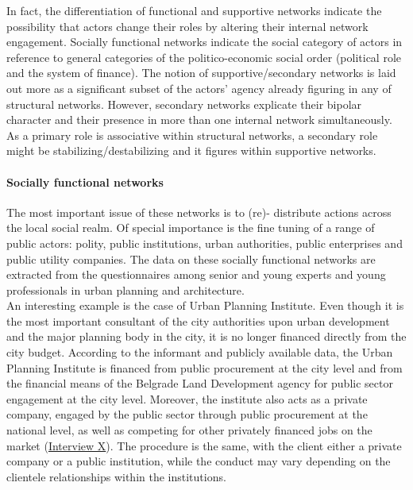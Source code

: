 \documentclass[11pt]{report}
\begin{document}
{{{{In fact, the differentiation of functional and supportive networks indicate the possibility that actors change their roles by altering their internal network engagement. Socially functional networks indicate the social category of actors in reference to general categories of the politico-economic social order (political role and the system of finance). The notion of supportive/secondary networks is laid out more as a significant subset of the actors’ agency already figuring in any of structural networks. However, secondary networks explicate their bipolar character and their presence in more than one internal network simultaneously. As a primary role is associative within structural networks, a secondary role might be stabilizing/destabilizing and it figures within supportive networks. 

\paragraph{Socially functional networks}

The most important issue of these networks is to (re)- distribute actions across the local social realm. Of special importance is the fine tuning of a range of public actors: polity, public institutions, urban authorities, public enterprises and public utility companies. The data on these socially functional networks are extracted from the questionnaires among senior and young experts and young professionals in urban planning and architecture. 
\\

An interesting example is the case of Urban Planning Institute. Even though it is the most important consultant of the city authorities upon urban development and the major planning body in the city, it is no longer financed directly from the city budget. According to the informant and publicly available data, the Urban Planning Institute is financed from public procurement at the city level and from the financial means of the Belgrade Land Development agency for public sector engagement at the city level. Moreover, the institute also acts as a private company, engaged by the public sector through public procurement at the national level, as well as competing for other privately financed jobs on the market (\href{InterviewX}{Interview X}).
The procedure is the same, with the client either a private company or a public institution, while the conduct may vary depending on the clientele relationships within the institutions.
\\

}}}}
\end{document}
